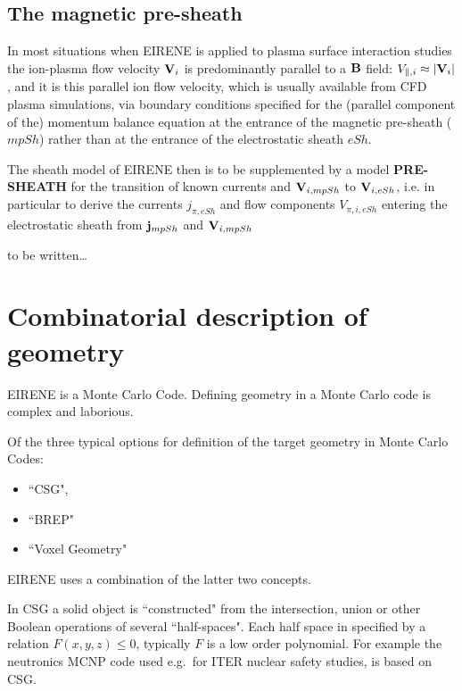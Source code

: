 \subsection{The magnetic pre-sheath} \label{sec1.4.2}

In most situations when EIRENE is applied to plasma surface interaction studies
the ion-plasma flow velocity $\mathbf{V}_i$ is predominantly parallel to a $\mathbf{B}$
field: $V_{\parallel,i} \approx |\mathbf{V}_i|$, and it is this parallel ion flow
velocity, which is usually available from \ac{CFD} plasma simulations, via
boundary conditions specified for the (parallel component of the) momentum
balance equation at the entrance of the magnetic pre-sheath ($mpSh$) rather
than at the entrance of the electrostatic sheath $eSh$.

The sheath model of EIRENE then is to be supplemented by a model
\textbf{PRE-SHEATH} for the transition of known currents and $\mathbf{V}_{i,mpSh}$  to
$\mathbf{V}_{i,eSh}$, i.e. in particular to derive the currents $j_{\pi,eSh}$ and flow
components $V_{\pi,i,eSh}$ entering the electrostatic sheath from $\mathbf{j}_{mpSh}$
and $\mathbf{V}_{i,mpSh}$ 

to be written\dots 

\newpage 

\section{Combinatorial description of geometry} \label{sec1.5}

EIRENE is a Monte Carlo Code.
Defining geometry in a Monte Carlo code is complex and laborious.

Of the three typical options for definition of the target geometry in Monte
Carlo Codes:
\begin{itemize}
  \item ``\ac{CSG}",
  \item ``\ac{BREP}"
  \item ``Voxel Geometry"
\end{itemize}
EIRENE uses a combination of the latter two concepts.

\medskip

In \ac{CSG} a solid object is ``constructed" from the intersection, union or
other Boolean operations of several ``half-spaces".
Each half space in specified by a relation $F(x,y,z)\le 0$, typically $F$ is a
low order polynomial.
For example the neutronics \ac{MCNP} code used e.g.\ for ITER nuclear safety
studies, is based on \ac{CSG}.

\medskip

